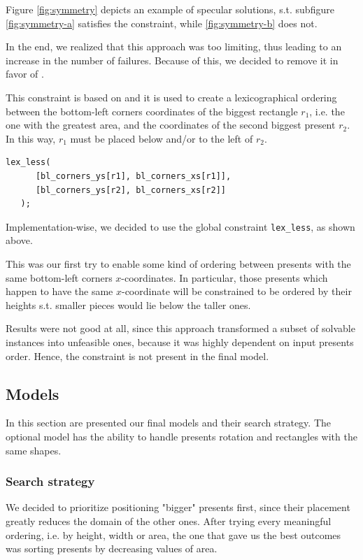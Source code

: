 \documentclass[a4paper,10pt]{article}
\newcounter{subsubsubsection}[subsubsection]
\begin{document}
Figure \ref{fig:symmetry} depicts an example of specular solutions, s.t. subfigure \ref{fig:symmetry-a} satisfies the constraint, while \ref{fig:symmetry-b} does not.

In the end, we realized that this approach was too limiting, thus leading to an increase in the number of failures. Because of this, we decided to remove it in favor of .

 \label{sec:areas-ordering}
This constraint is based on \cite{sweep} and it is used to create a lexicographical ordering between the bottom-left corners coordinates of the biggest rectangle $r_{1}$, i.e. the one with the greatest area, and the coordinates of the second biggest present $r_{2}$.
In this way, $r_{1}$ must be placed below and/or to the left of $r_{2}$.

\begin{Verbatim}[samepage=true]
   lex_less(
      [bl_corners_ys[r1], bl_corners_xs[r1]],
      [bl_corners_ys[r2], bl_corners_xs[r2]]
   );
\end{Verbatim}

Implementation-wise, we decided to use the global constraint \texttt{lex\_less}, as shown above.

 \label{sec:width-ordering}
This was our first try to enable some kind of ordering between presents with the same bottom-left corners $x$-coordinates.
In particular, those presents which happen to have the same $x$-coordinate will be constrained to be ordered by their heights s.t. smaller pieces would lie below the taller ones.

Results were not good at all, since this approach transformed a subset of solvable instances into unfeasible ones, because it was highly dependent on input presents order. Hence, the constraint is not present in the final model.

\subsection{Models}
In this section are presented our final models and their search strategy. The optional model has the ability to handle presents rotation and rectangles with the same shapes.

\subsubsection{Search strategy}
We decided to prioritize positioning "bigger" presents first, since their placement greatly reduces the domain of the other ones. After trying every meaningful ordering, i.e. by height, width or area, the one that gave us the best outcomes was sorting presents by decreasing values of area.
\end{document}
